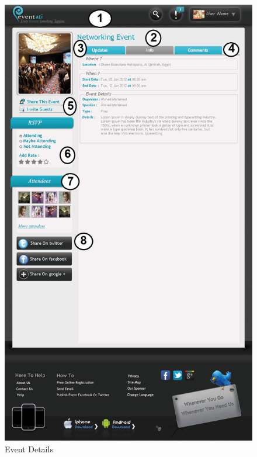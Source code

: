 \documentclass[12pt,a4paper,class,twoside,openany]{report}
\begin{document}
{\begin{figure}
\begin{center}
\includegraphics[height=8 in]{8-5}
\caption{Event Details}
\label{fg:8-5}
\end{center}
\end{figure}
\begin{figure}
\begin{center}

\end{center}
\end{figure}}
\end{document}
